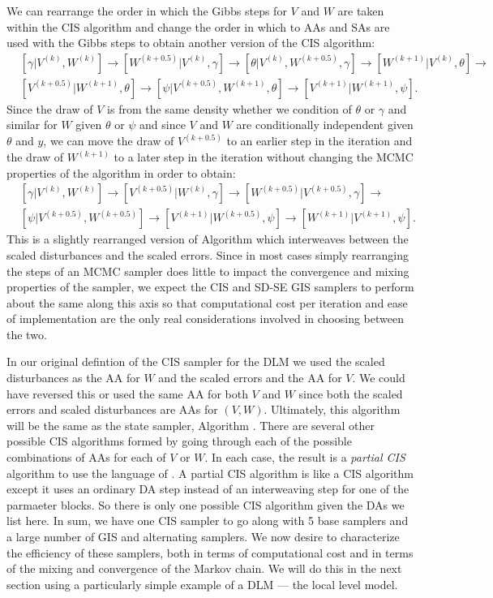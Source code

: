 \documentclass{article}
\begin{document}
We can rearrange the order in which the Gibbs steps for $V$ and $W$ are taken within the CIS algorithm and change the order in which to AAs and SAs are used with the Gibbs steps to obtain another version of the CIS algorithm:
\begin{align*}
&[\gamma|V^{(k)},W^{(k)}] \to [W^{(k+0.5)}|V^{(k)},\gamma] \to [\theta|V^{(k)},W^{(k+0.5)},\gamma] \to [W^{(k+1)}|V^{(k)},\theta]\to \\
&[V^{(k+0.5)}|W^{(k+1)},\theta] \to [\psi|V^{(k+0.5)},W^{(k+1)},\theta] \to [V^{(k+1)}|W^{(k+1)},\psi].
\end{align*}
Since the draw of $V$ is from the same density whether we condition of $\theta$ or $\gamma$ and similar for $W$ given $\theta$ or $\psi$ and since $V$ and $W$ are conditionally independent given $\theta$ and $y$, we can move the draw of $V^{(k+0.5)}$ to an earlier step in the iteration and the draw of $W^{(k+1)}$ to a later step in the iteration without changing the MCMC properties of the algorithm in order to obtain:
\begin{align*}
&[\gamma|V^{(k)},W^{(k)}] \to [V^{(k+0.5)}|W^{(k)},\gamma] \to[W^{(k+0.5)}|V^{(k+0.5)},\gamma] \to \\
&[\psi|V^{(k+0.5)},W^{(k+0.5)}]\to [V^{(k+1)}|W^{(k+0.5)},\psi]\to [W^{(k+1)}|V^{(k+1)},\psi].
\end{align*}
This is a slightly rearranged version of Algorithm  which interweaves between the scaled disturbances and the scaled errors. Since in most cases simply rearranging the steps of an MCMC sampler does little to impact the convergence and mixing properties of the sampler, we expect the CIS and SD-SE GIS samplers to perform about the same along this axis so that computational cost per iteration and ease of implementation are the only real considerations involved in choosing between the two.

In our original defintion of the CIS sampler for the DLM we used the scaled disturbances as the AA for $W$ and the scaled errors and the AA for $V$. We could have reversed this or used the same AA for both $V$ and $W$ since both the scaled errors and scaled disturbances are AAs for $(V,W)$. Ultimately, this algorithm will be the same as the state sampler, Algorithm . There are several other possible CIS algorithms formed by going through each of the possible combinations of AAs for each of $V$ or $W$. In each case, the result is a {\it partial CIS} algorithm to use the language of . A partial CIS algorithm is like a CIS algorithm except it uses an ordinary DA step instead of an interweaving step for one of the parmaeter blocks. So there is only one possible CIS algorithm given the DAs we list here. In sum, we have one CIS sampler to go along with 5 base samplers and a large number of GIS and alternating samplers. We now desire to characterize the efficiency of these samplers, both in terms of computational cost and in terms of the mixing and convergence of the Markov chain. We will do this in the next section using a particularly simple example of a DLM --- the local level model.
\end{document}
